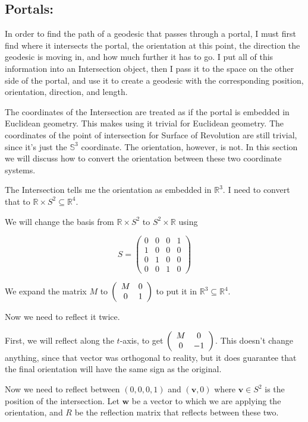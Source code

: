 \bigskip

\subsection{Portals:}

In order to find the path of a geodesic that passes through a portal, I must first find where it intersects the portal, the orientation at this point, the direction the geodesic is moving in, and how much further it has to go. I put all of this information into an Intersection object, then I pass it to the space on the other side of the portal, and use it to create a geodesic with the corresponding position, orientation, direction, and length.


The coordinates of the Intersection are treated as if the portal is embedded in Euclidean geometry. This makes using it trivial for Euclidean geometry. The coordinates of the point of intersection for Surface of Revolution are still trivial, since it's just the $\mathbb{S}^3$ coordinate. The orientation, however, is not. In this section we will discuss how to convert the orientation between these two coordinate systems.

The Intersection tells me the orientation as embedded in $\mathbb{R}^3$. I need to convert that to $\mathbb{R} \times S^2 \subseteq \mathbb{R}^4$.

We will change the basis from $\mathbb{R} \times S^2$ to $S^2 \times \mathbb{R}$ using 

$$S = \left(\begin{array}{cccc}
		0 & 0 & 0 & 1 \\
		1 & 0 & 0 & 0 \\
		0 & 1 & 0 & 0 \\
		0 & 0 & 1 & 0
	\end{array} \right)$$

We expand the matrix $M$ to $\left(\begin{array}{ccc} M & 0 \\0 & 1 \end{array} \right)$ to put it in $\mathbb{R}^3 \subseteq \mathbb{R}^4$.

Now we need to reflect it twice.

First, we will reflect along the $t$-axis, to get $\left(\begin{array}{ccc} M & 0 \\0 & -1 \end{array} \right)$. This doesn't change anything, since that vector was orthogonal to reality, but it does guarantee that the final orientation will have the same sign as the original.

Now we need to reflect between $(0,0,0,1)$ and $(\textbf{v},0)$ where $\textbf{v} \in S^2$ is the position of the intersection. Let $\textbf{w}$ be a vector to which we are applying the orientation, and $R$ be the reflection matrix that reflects between these two.

